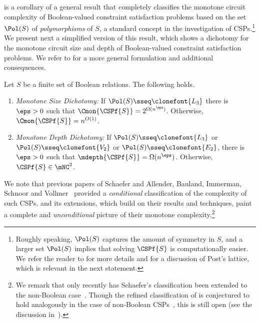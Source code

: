 \documentclass[11pt]{article}
\begin{document}
 is a corollary of a general result that completely
classifies the monotone circuit complexity of Boolean-valued constraint
satisfaction problems based on the set $\Pol(S)$ of \emph{polymorphisms} of
$S$, a standard concept in the investigation of CSPs.\footnote{Roughly
speaking, $\Pol(S)$ captures the amount of symmetry in $S$, and a larger
set $\Pol(S)$  implies that solving $\CSPf{S}$ is computationally easier.
We refer the reader to  for more details and for a
discussion of Post's lattice, which is relevant in the next statement.} We
present next a simplified version of this result, which shows a dichotomy
for the monotone circuit size and depth of Boolean-valued constraint
satisfaction problems. We refer to   for a more general
formulation and additional consequences.


\begin{theorem}
    \label{thm:intro-mon-dichotomies}
    Let $S$ be a finite set of Boolean relations. The following holds.
    \begin{enumerate}
        \item \emph{Monotone Size Dichotomy:} If 
    $\Pol(S) \sseq \clonefont{L_3}$
     there is $\eps > 0$
    such that
    $\Cmon{\CSPf{S}} = 2^{\Omega(n^\eps)}$.
    Otherwise, 
    $\Cmon{\CSPf{S}} = n^{O(1)}$.

\item \emph{Monotone Depth Dichotomy:}
    If 
    $\Pol(S) \sseq \clonefont{L_3}$ or
    $\Pol(S) \sseq \clonefont{V_2}$ or
    $\Pol(S) \sseq \clonefont{E_2}$,
     there is $\eps > 0$
    such that
    $\mdepth{\CSPf{S}} = {\Omega(n^\eps)}$.
    Otherwise, 
    $\CSPf{S} \in \mNC^2$.
    \end{enumerate}
    
\end{theorem}

We note that previous papers of Schaefer \citep{DBLP:conf/stoc/Schaefer78} and 
Allender, Bauland, Immerman, Schnoor and Vollmer~\citep{DBLP:journals/jcss/AllenderBISV09}
provided a \emph{conditional}
classification of the complexity of such CSPs.  
 and its extensions, which build on their
results and techniques, paint a complete and \emph{unconditional} picture of their
monotone complexity.\footnote{
We 
remark that only recently has Schaefer's classification
been extended to the non-Boolean
case~\cite{DBLP:conf/focs/Zhuk17,DBLP:conf/focs/Bulatov17}.
Though the refined classification of 
\cite{DBLP:journals/jcss/AllenderBISV09} 
is conjectured
to hold analogously in the case of non-Boolean
CSPs~\cite{DBLP:journals/tcs/LaroseT09},
this is still open (see the discussion
in~\cite[Section 7]{DBLP:journals/siglog/Bulatov18}).
}
\end{document}
